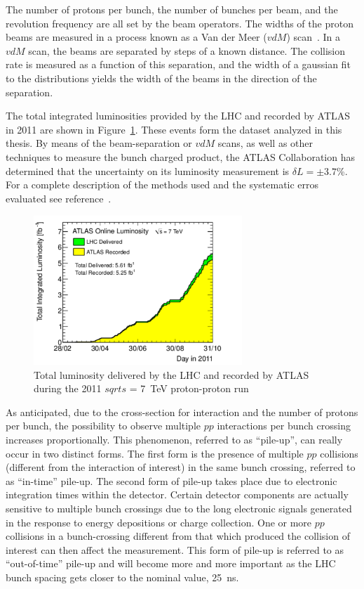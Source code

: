 The number of protons per bunch, the number of bunches per beam, and the revolution frequency are all set by the beam operators. The widths of the proton beams are measured in a process known as a Van der Meer ($vdM$) scan~\cite{vanderMeer:296752}. In a $vdM$ scan, the beams are separated by steps of a known distance. The collision rate is measured as a function of this separation, and the width of a gaussian fit to the distributions yields the width of the beams in the direction of the separation.  

The total integrated luminosities provided by the LHC and recorded by ATLAS in 2011 are shown in Figure~\ref{fig:integratedlumi}. These events form the dataset analyzed in this thesis. By means of the beam-separation or $vdM$ scans, as well as other techniques to measure the bunch charged product, the ATLAS Collaboration has determined that the uncertainty on its luminosity measurement is $\delta L = \pm 3.7$\%. For a complete description of the methods used and the systematic erros evaluated see reference~\cite{ATLAS-CONF-2011-116}.

\begin{figure}[htbp]
  \begin{center}
      \includegraphics[width=0.7\textwidth]{Fig2/sumLumiByDay.pdf}
    \caption{Total luminosity delivered by the LHC and recorded by ATLAS during the 2011 $sqrt{s}$ = 7~TeV proton-proton run}
    \label{fig:integratedlumi}
  \end{center}
\end{figure}


As anticipated, due to the cross-section for interaction and the number of protons per bunch, the possibility to observe multiple $pp$ interactions per bunch crossing increases proportionally. This phenomenon, referred to as ``pile-up'', can really occur in two distinct forms. The first form is the presence of multiple $pp$ collisions (different from the interaction of interest) in the same bunch crossing, referred to as ``in-time'' pile-up. The second form of pile-up takes place due to electronic integration times within the detector. Certain detector components are actually sensitive to multiple bunch crossings due to the long electronic signals generated in the response to energy depositions or charge collection. One or more $pp$ collisions in a bunch-crossing different from that which produced the collision of interest can then affect the measurement. This form of pile-up is referred to as ``out-of-time'' pile-up and will become more and more important as the LHC bunch spacing gets closer to the nominal value, 25~ns.

